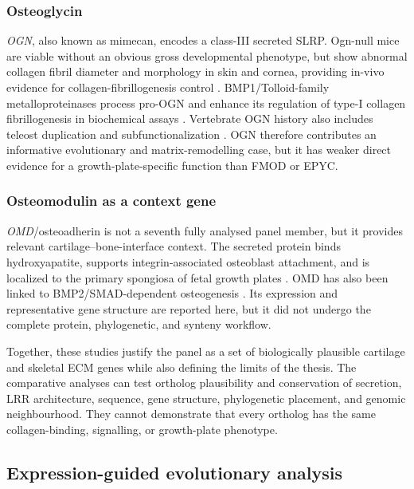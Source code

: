 \subsubsection{Osteoglycin}

\textit{OGN}, also known as mimecan, encodes a class-III secreted SLRP. Ogn-null
mice are viable without an obvious gross developmental phenotype, but show
abnormal collagen fibril diameter and morphology in skin and cornea, providing
in-vivo evidence for collagen-fibrillogenesis control \citep{Tasheva2002}.
BMP1/Tolloid-family metalloproteinases process pro-OGN and enhance its regulation
of type-I collagen fibrillogenesis in biochemical assays \citep{Ge2004}.
Vertebrate OGN history also includes teleost duplication and
subfunctionalization \citep{Costa2018}. OGN therefore contributes an informative
evolutionary and matrix-remodelling case, but it has weaker direct evidence for
a growth-plate-specific function than FMOD or EPYC.

\subsubsection{Osteomodulin as a context gene}

\textit{OMD}/osteoadherin is not a seventh fully analysed panel member, but it
provides relevant cartilage--bone-interface context. The secreted protein binds
hydroxyapatite, supports integrin-associated osteoblast attachment, and is
localized to the primary spongiosa of fetal growth plates \citep{Sommarin1998}.
OMD has also been linked to BMP2/SMAD-dependent osteogenesis
\citep{Lin2021OMD}. Its expression and representative gene structure are
reported here, but it did not undergo the complete protein, phylogenetic, and
synteny workflow.

Together, these studies justify the panel as a set of biologically plausible
cartilage and skeletal ECM genes while also defining the limits of the thesis.
The comparative analyses can test ortholog plausibility and conservation of
secretion, LRR architecture, sequence, gene structure, phylogenetic placement,
and genomic neighbourhood. They cannot demonstrate that every ortholog has the
same collagen-binding, signalling, or growth-plate phenotype.

\subsection{Expression-guided evolutionary analysis}
\label{subsec:expression-guided-evolution}

